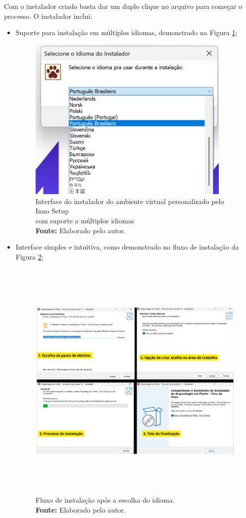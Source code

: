Com o instalador criado basta dar um duplo clique no arquivo para começar o processo. O instalador inclui:
\begin{itemize}
    \item Suporte para instalação em múltiplos idiomas, demonstrado na Figura \ref{fig:idiomas};
    \begin{figure}[H]
        \centering
        \includegraphics[height=8cm, keepaspectratio]{img/Inno setup/multiidiomas.png}
        \caption{Interface do instalador do ambiente virtual personalizado pelo Inno Setup \\ com suporte a múltiplos idiomas \\
            \textbf{Fonte:} Elaborado pelo autor.}
        \label{fig:idiomas}
\end{figure}

    \item Interface simples e intuitiva, como demonstrado no fluxo de instalação da Figura \ref{fig:fluxo};
    \begin{figure}[H]
        \centering
        \includegraphics[height=12cm, keepaspectratio]{img/Inno setup/fluxo de instalação.png}
        \caption{Fluxo de instalação após a escolha do idioma. \\
            \textbf{Fonte:} Elaborado pelo autor.}
        \label{fig:fluxo}
\end{figure}


\end{itemize}
